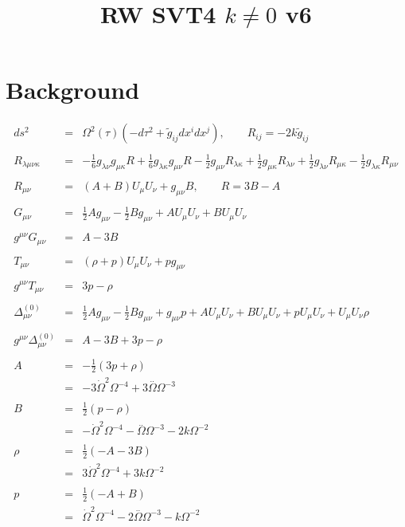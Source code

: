 \documentclass[10pt,letterpaper]{article}
\title{RW SVT4 $k\ne 0$ v6}
\date{}
\numberwithin{equation}{section}
\begin{document}
 
\maketitle
\noindent 
\section{Background}
\begin{eqnarray}
ds^2 &=& \Omega^2(\tau)\left(-d\tau^2 +\tilde g_{ij} dx^i dx^j\right),\qquad R_{ij} = -2k \tilde g_{ij}
\label{geom2}
\\ \nonumber\\
R_{\lambda\mu\nu\kappa} &=&- \tfrac{1}{6} g_{\lambda \nu } g_{\mu \kappa } R + \tfrac{1}{6} g_{\lambda \kappa } g_{\mu \nu } R -  \tfrac{1}{2} g_{\mu \nu } R_{\lambda \kappa } + \tfrac{1}{2} g_{\mu \kappa } R_{\lambda \nu } + \tfrac{1}{2} g_{\lambda \nu } R_{\mu \kappa } -  \tfrac{1}{2} g_{\lambda \kappa } R_{\mu \nu }
\\ \nonumber\\
R_{\mu\nu} &=& (A+B)U_\mu U_\nu + g_{\mu\nu}B,\qquad R=3B-A
\label{Ricci}
\\ \nonumber\\
G_{\mu\nu}&=& \tfrac{1}{2} A g_{\mu \nu } -  \tfrac{1}{2} B g_{\mu \nu } + A U_{\mu } U_{\nu } + B U_{\mu } U_{\nu }
\\  \nonumber\\ 
g^{\mu\nu}G_{\mu\nu}&=& A - 3 B
\\ \nonumber\\
T_{\mu\nu} &=& (\rho+p)U_\mu U_\nu +  p g_{\mu\nu}
\\ \nonumber\\
g^{\mu\nu}T_{\mu\nu} &=& 3p-\rho
\\ \nonumber\\
\Delta_{\mu\nu}^{(0)}&=&\tfrac{1}{2} A g_{\mu \nu } -  \tfrac{1}{2} B g_{\mu \nu } + g_{\mu \nu } p + A U_{\mu } U_{\nu } + B U_{\mu } U_{\nu } + p U_{\mu } U_{\nu } + U_{\mu } U_{\nu } \rho 
\label{Delta}
\\ \nonumber\\
g^{\mu\nu}\Delta_{\mu\nu}^{(0)}&=& A - 3 B + 3 p -  \rho 
\label{Delta4tr}
\\ \nonumber\\
A &=& -\tfrac12 (3p+\rho)
\nonumber\\
&=& -3 \dot{\Omega}^2 \Omega^{-4} + 3 \overset{..}{\Omega} \Omega^{-3}
\\ \nonumber\\
B&=& \tfrac12(p-\rho)
\nonumber\\
&=& - \dot{\Omega}^2 \Omega^{-4} -  \overset{..}{\Omega} \Omega^{-3} - 2 k \Omega^{-2}
\\ \nonumber\\
\rho &=& \tfrac{1}{2} (- A - 3 B)
\nonumber\\
&=& 3 \dot{\Omega}^2 \Omega^{-4} + 3 k \Omega^{-2}
\\ \nonumber\\
p &=& \tfrac{1}{2} (- A + B)
\nonumber\\
&=& \dot{\Omega}^2 \Omega^{-4} - 2 \overset{..}{\Omega} \Omega^{-3} -  k \Omega^{-2}
\end{eqnarray}
%
%
\end{document}
